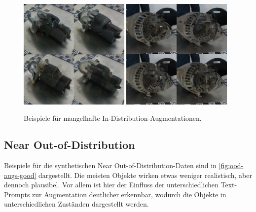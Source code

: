 \begin{figure}
	\centering
	\includegraphics[width=0.48\textwidth]{figure_results_id-augs_bad_1.png}%
	\hspace{0.02\textwidth}\includegraphics[width=0.48\textwidth]{figure_results_id-augs_bad_2.png}
	\caption{Beispiele für mangelhafte In-Distribution-Augmentationen.}
	\label{fig:id-augs-bad}
\end{figure}

\subsection{Near Out-of-Distribution} \label{subsec:da-fusion-ood-results}

Beispiele für die synthetischen Near Out-of-Distribution-Daten sind in \autoref{fig:ood-augs-good} dargestellt. Die meisten Objekte wirken etwas weniger realistisch, aber dennoch plausibel. Vor allem ist hier der Einfluss der unterschiedlichen Text-Prompts zur Augmentation deutlicher erkennbar, wodurch die Objekte in unterschiedlichen Zuständen dargestellt werden.

